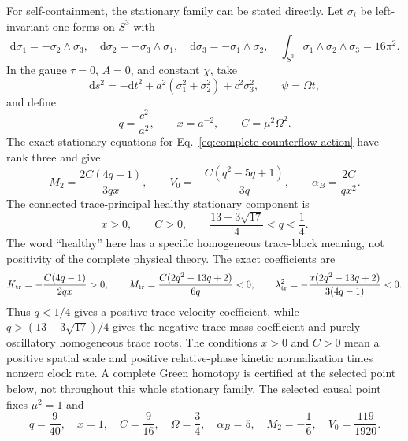 \documentclass[11pt]{article}
\newcommand{\dd}{\mathrm d}
\begin{document}
For self-containment, the stationary family can be stated directly.  Let
$\sigma_i$ be left-invariant one-forms on $S^3$ with
\begin{equation}
 \dd\sigma_1=-\sigma_2\wedge\sigma_3,
 \quad \dd\sigma_2=-\sigma_3\wedge\sigma_1,
 \quad \dd\sigma_3=-\sigma_1\wedge\sigma_2,
 \quad \int_{S^3}\sigma_1\wedge\sigma_2\wedge\sigma_3=16\pi^2.
\end{equation}
In the gauge $\tau=0$, $A=0$, and constant $\chi$, take
\begin{equation}
 \dd s^2=-\dd t^2+a^2(\sigma_1^2+\sigma_2^2)+c^2\sigma_3^2,
 \qquad \psi=\Omega t,
\end{equation}
and define
\begin{equation}
 q=\frac{c^2}{a^2},\qquad x=a^{-2},\qquad C=\mu^2\Omega^2.
\end{equation}
The exact stationary equations for Eq.~\eqref{eq:complete-counterflow-action}
have rank three and give
\begin{equation}
 M_2=\frac{2C(4q-1)}{3qx},\qquad
 V_0=-\frac{C(q^2-5q+1)}{3q},\qquad
 \alpha_B=\frac{2C}{qx^2}.
 \label{eq:counterflow-stationary-family}
\end{equation}
The connected trace-principal healthy stationary component is
\begin{equation}
 x>0,\qquad C>0,\qquad
 \frac{13-3\sqrt{17}}4<q<\frac14.
 \label{eq:counterflow-healthy-component}
\end{equation}
The word ``healthy'' here has a specific homogeneous trace-block meaning,
not positivity of the complete physical theory.  The exact coefficients are
\begin{equation}
 K_{\rm tr}=-\frac{C(4q-1)}{2qx}>0,
 \qquad
 M_{\rm tr}=\frac{C(2q^2-13q+2)}{6q}<0,
 \qquad
 \lambda_{\rm tr}^2
 =-\frac{x(2q^2-13q+2)}{3(4q-1)}<0.
 \label{eq:counterflow-trace-inequalities}
\end{equation}
Thus $q<1/4$ gives a positive trace velocity coefficient, while
$q>(13-3\sqrt{17})/4$ gives the negative trace mass coefficient and purely
oscillatory homogeneous trace roots.  The conditions $x>0$ and $C>0$ mean a
positive spatial scale and positive relative-phase kinetic normalization
times nonzero clock rate.  A complete Green homotopy is certified at the
selected point below, not throughout this whole stationary family.
The selected causal point fixes $\mu^2=1$ and
\begin{equation}
 q=\frac9{40},\quad x=1,\quad C=\frac9{16},\quad
 \Omega=\frac34,\quad \alpha_B=5,\quad
 M_2=-\frac16,\quad V_0=\frac{119}{1920}.
 \label{eq:counterflow-point}
\end{equation}
\end{document}
